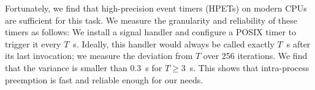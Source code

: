 Fortunately, we find that high-precision event timers (HPETs) on modern CPUs
are sufficient for this task. We measure the granularity and reliability of
these timers as follows: We install a signal handler and configure a POSIX timer to
trigger it every $T$~\textmu{}s.
Ideally, this handler would always be called exactly $T$~\textmu{}s after its last
invocation; we measure the deviation from $T$ over 256 iterations.
We find that the variance
is smaller than 0.3~\textmu{}s for $T \ge 3$~\textmu{}s. This shows that
intra-process preemption is fast and reliable enough for our needs.
